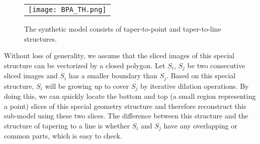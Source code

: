 \begin{figure}[htbp]
\begin{center}
\begin{tabular}{c}
\texttt{[image: BPA\_TH.png]}
\end{tabular}
\end{center}
\caption{ The synthetic model consists of taper-to-point and taper-to-line structures. }
\label{fig:DXF_taper_both}
\end{figure}

Without loss of generality, we assume that the sliced images of this special structure
can be vectorized by a closed polygon.
Let $S_i$, $S_j$ be two consecutive sliced images and $S_i$
has a smaller boundary than $S_j$. Based on this special structure, $S_i$ will be growing up
to cover $S_j$ by iterative dilation operations. By doing this, we can quickly locate the
bottom and top (a small region representing a point) slices of this special geometry
structure and therefore reconstruct this sub-model using these two slices.
The difference between this structure and the structure of tapering to a line is whether
$S_i$ and $S_j$ have any overlapping or common parts, which is easy to check.




